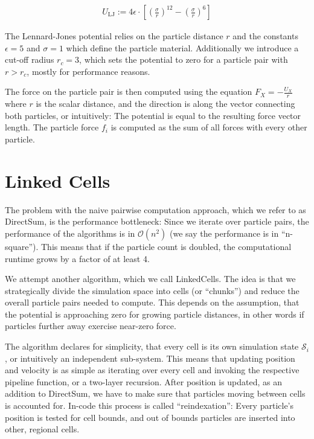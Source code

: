\documentclass[11pt,
               a4paper,
               bibtotoc,
               idxtotoc,
               headsepline,
               footsepline,
               footexclude,
               BCOR12mm,
               DIV13,
               openany,   %
               ]
               {scrbook}
\begin{document}
\begin{align}
U_\text{LJ} := 4 \epsilon \cdot \left[{{\left(\frac{\sigma}{r}\right)}^{12}} - {{\left(\frac{\sigma}{r}\right)}^6}\right]
\label{potential-lennard-jones}
\end{align}

The Lennard-Jones potential relies on the particle distance $r$ and the constants $\epsilon = 5$ and $\sigma = 1$ which define the particle material. %
Additionally we introduce a cut-off radius $r_c = 3$, which sets the potential to zero for a particle pair with $r > r_c$, mostly for performance reasons.

The force on the particle pair is then computed using the equation $F_X = -\frac{U_X}{r}$ where $r$ is the scalar distance, and the direction is along the vector connecting both particles, or intuitively: The potential is equal to the resulting force vector length. The particle force $f_i$ is computed as the sum of all forces with every other particle.

\section{Linked Cells}

The problem with the naive pairwise computation approach, which we refer to as DirectSum, is the performance bottleneck: Since we iterate over particle pairs, the performance of the algorithms is in $\mathcal O (n^2)$ (we say the performance is in ``n-square''). This means that if the particle count is doubled, the computational runtime grows by a factor of at least 4.

We attempt another algorithm, which we call LinkedCells. The idea is that we strategically divide the simulation space into cells (or ``chunks'') and reduce the overall particle pairs needed to compute. This depends on the assumption, that the potential is approaching zero for growing particle distances, in other words if particles further away exercise near-zero force.

The algorithm declares for simplicity, that every cell is its own simulation state ${\mathcal S}_i$, or intuitively an independent sub-system. This means that updating position and velocity is as simple as iterating over every cell and invoking the respective pipeline function, or a two-layer recursion. After position is updated, as an addition to DirectSum, we have to make sure that particles moving between cells is accounted for. In-code this process is called ``reindexation'': Every particle's position is tested for cell bounds, and out of bounds particles are inserted into other, regional cells.
\end{document}
